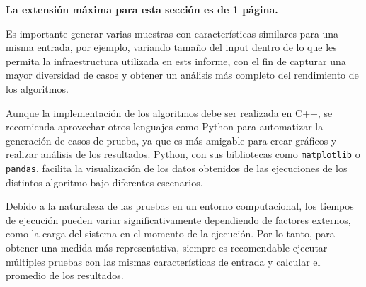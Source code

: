 \begin{mdframed}
    \textbf{La extensión máxima para esta sección es de 1 página.}
\end{mdframed}
Es importante generar varias muestras con características similares para una misma entrada, por ejemplo, variando tamaño del input dentro de lo que les permita la infraestructura utilizada en ests informe, con el fin de capturar una mayor diversidad de casos y obtener un análisis más completo del rendimiento de los algoritmos.

\begin{mdframed}
    Aunque la implementación de los algoritmos debe ser realizada en C++, se recomienda aprovechar otros lenguajes como Python para automatizar la generación de casos de prueba, ya que es más amigable para crear gráficos y realizar análisis de los resultados. Python, con sus bibliotecas como \texttt{matplotlib} o \texttt{pandas}, facilita la visualización de los datos obtenidos de las ejecuciones de los distintos algoritmo bajo diferentes escenarios.
\end{mdframed}    

\begin{mdframed}    
    Debido a la naturaleza de las pruebas en un entorno computacional, los tiempos de ejecución pueden variar significativamente dependiendo de factores externos, como la carga del sistema en el momento de la ejecución. Por lo tanto, para obtener una medida más representativa, siempre es recomendable ejecutar múltiples pruebas con las mismas características de entrada y calcular el promedio de los resultados.
\end{mdframed}
